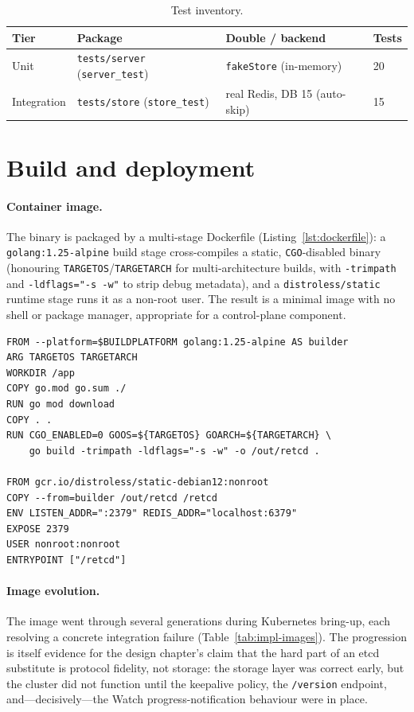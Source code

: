 \begin{table}[h]
    \centering
    \caption{Test inventory.}
    \label{tab:impl-tests}
    \begin{tabular}{@{}llll@{}}
        \toprule
        \textbf{Tier} & \textbf{Package} & \textbf{Double / backend} & \textbf{Tests} \\
        \midrule
        Unit        & \texttt{tests/server} (\texttt{server\_test}) & \texttt{fakeStore} (in-memory) & 20 \\
        Integration & \texttt{tests/store} (\texttt{store\_test})   & real Redis, DB 15 (auto-skip) & 15 \\
        \bottomrule
    \end{tabular}
\end{table}

\section{Build and deployment}
\label{sec:impl-deploy}

\paragraph{Container image.}
The binary is packaged by a multi-stage Dockerfile (Listing~\ref{lst:dockerfile}): a \texttt{golang:1.25-alpine} build stage cross-compiles a static, \texttt{CGO}-disabled binary (honouring \texttt{TARGETOS}/\texttt{TARGETARCH} for multi-architecture builds, with \texttt{-trimpath} and \texttt{-ldflags="-s -w"} to strip debug metadata), and a \texttt{distroless/static} runtime stage runs it as a non-root user. The result is a minimal image with no shell or package manager, appropriate for a control-plane component.

\begin{lstlisting}[caption={Multi-stage, multi-arch container build (\texttt{Dockerfile}).},label=lst:dockerfile]
FROM --platform=$BUILDPLATFORM golang:1.25-alpine AS builder
ARG TARGETOS TARGETARCH
WORKDIR /app
COPY go.mod go.sum ./
RUN go mod download
COPY . .
RUN CGO_ENABLED=0 GOOS=${TARGETOS} GOARCH=${TARGETARCH} \
    go build -trimpath -ldflags="-s -w" -o /out/retcd .

FROM gcr.io/distroless/static-debian12:nonroot
COPY --from=builder /out/retcd /retcd
ENV LISTEN_ADDR=":2379" REDIS_ADDR="localhost:6379"
EXPOSE 2379
USER nonroot:nonroot
ENTRYPOINT ["/retcd"]
\end{lstlisting}

\paragraph{Image evolution.}
The image went through several generations during Kubernetes bring-up, each resolving a concrete integration failure (Table~\ref{tab:impl-images}). The progression is itself evidence for the design chapter's claim that the hard part of an etcd substitute is protocol fidelity, not storage: the storage layer was correct early, but the cluster did not function until the keepalive policy, the \texttt{/version} endpoint, and---decisively---the Watch progress-notification behaviour were in place.

